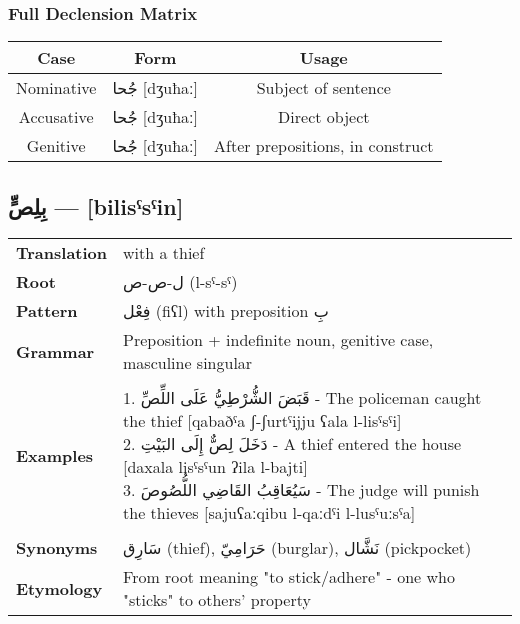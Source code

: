 \documentclass[letter,12pt]{article}
\begin{document}
\subsubsection*{Full Declension Matrix}
\begin{tabular}{|c|c|c|}
\hline
\textbf{Case} & \textbf{Form} & \textbf{Usage} \\
\hline
Nominative & \textarabic{جُحا} [dʒuħaː] & Subject of sentence \\
\hline
Accusative & \textarabic{جُحا} [dʒuħaː] & Direct object \\
\hline
Genitive & \textarabic{جُحا} [dʒuħaː] & After prepositions, in construct \\
\hline
\end{tabular}

\subsection{\textarabic{بِلِصٍّ} — [bilisˤsˤin]}
\begin{tabular}{p{3cm}p{10cm}}
\toprule
\textbf{Translation} & with a thief \\
\textbf{Root} & \textarabic{ل-ص-ص} (l-sˤ-sˤ) \\
\textbf{Pattern} & \textarabic{فِعْل} (fiʕl) with preposition \textarabic{بِ} \\
\textbf{Grammar} & Preposition + indefinite noun, genitive case, masculine singular \\
\midrule \\
\textbf{Examples} & \makecell[l]{\parbox{9.5cm}{
1. \textarabic{قَبَضَ الشُّرْطِيُّ عَلَى اللِّصِّ} - The policeman caught the thief [qabaðˤa ʃ-ʃurtˤijju ʕala l-lisˤsˤi]\\
2. \textarabic{دَخَلَ لِصٌّ إِلَى البَيْتِ} - A thief entered the house [daxala lisˤsˤun ʔila l-bajti]\\
3. \textarabic{سَيُعَاقِبُ القَاضِي اللُّصُوصَ} - The judge will punish the thieves [sajuʕaːqibu l-qaːdˤi l-lusˤuːsˤa]
}} \\
\midrule \\
\textbf{Synonyms} & \textarabic{سَارِق} (thief), \textarabic{حَرَامِيّ} (burglar), \textarabic{نَشَّال} (pickpocket) \\
\textbf{Etymology} & From root meaning "to stick/adhere" - one who "sticks" to others' property \\
\bottomrule
\end{tabular}
\end{document}
